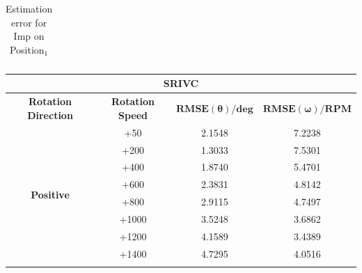 \documentclass[english]{isasthesis}
\begin{document}
\begin{table}[]
\begin{tabular}{|c|c|c|c|}
\end{tabular}
\caption{Estimation error for Imp on Position$_1$}
\label{table:estimation error imp}
\end{table} 
\begin{table}[]
\begin{tabular}{|c|c|c|c|}
\hline
\multicolumn{4}{|c|}{\textbf{SRIVC}}                                                                                                                                        \\ \hline\hline
\textbf{Rotation Direction}        & \textbf{Rotation Speed}                                                & $\mathbf{RMSE(\theta) / deg}$ & $\mathbf{RMSE(\omega) / RPM}$ \\ \hline
\multirow{9}{*}{\textbf{Positive}} & +50                                                                   &    2.1548                           &       7.2238                       \\ \cline{2-4}
& +200                                                                   &    1.3033 &        7.5301                       												\\ \cline{2-4}
  & +400                                                                   &     1.8740 &      5.4701                         \\ \cline{2-4}
                                   & +600                                                                   &         2.3831                      &             4.8142                  \\ \cline{2-4}
                                   & +800                                                                   &       2.9115                        &              4.7497                 \\ \cline{2-4}
                                   & +1000                                                                  &        3.5248                       &             3.6862                  \\ \cline{2-4}
                                   & +1200                                                                  &          4.1589                     &            3.4389                   \\ \cline{2-4}
                                   & +1400                                                                  &       4.7295                        &               4.0516                \\ \cline{2-4} 

\end{tabular}
\end{table}
\end{document}

